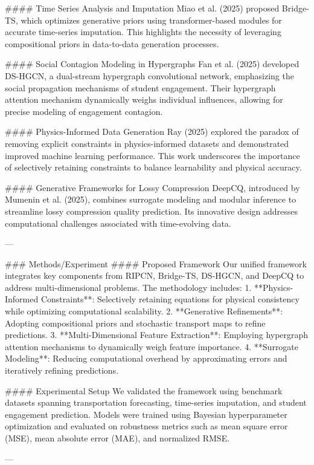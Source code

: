 #### Time Series Analysis and Imputation  
Miao et al. (2025) proposed Bridge-TS, which optimizes generative priors using transformer-based modules for accurate time-series imputation. This highlights the necessity of leveraging compositional priors in data-to-data generation processes.

#### Social Contagion Modeling in Hypergraphs  
Fan et al. (2025) developed DS-HGCN, a dual-stream hypergraph convolutional network, emphasizing the social propagation mechanisms of student engagement. Their hypergraph attention mechanism dynamically weighs individual influences, allowing for precise modeling of engagement contagion.

#### Physics-Informed Data Generation  
Ray (2025) explored the paradox of removing explicit constraints in physics-informed datasets and demonstrated improved machine learning performance. This work underscores the importance of selectively retaining constraints to balance learnability and physical accuracy.

#### Generative Frameworks for Lossy Compression  
DeepCQ, introduced by Mumenin et al. (2025), combines surrogate modeling and modular inference to streamline lossy compression quality prediction. Its innovative design addresses computational challenges associated with time-evolving data.

---

### Methods/Experiment  
#### Proposed Framework  
Our unified framework integrates key components from RIPCN, Bridge-TS, DS-HGCN, and DeepCQ to address multi-dimensional problems. The methodology includes:  
1. **Physics-Informed Constraints**: Selectively retaining equations for physical consistency while optimizing computational scalability.  
2. **Generative Refinements**: Adopting compositional priors and stochastic transport maps to refine predictions.  
3. **Multi-Dimensional Feature Extraction**: Employing hypergraph attention mechanisms to dynamically weigh feature importance.  
4. **Surrogate Modeling**: Reducing computational overhead by approximating errors and iteratively refining predictions.

#### Experimental Setup  
We validated the framework using benchmark datasets spanning transportation forecasting, time-series imputation, and student engagement prediction. Models were trained using Bayesian hyperparameter optimization and evaluated on robustness metrics such as mean square error (MSE), mean absolute error (MAE), and normalized RMSE.

---

